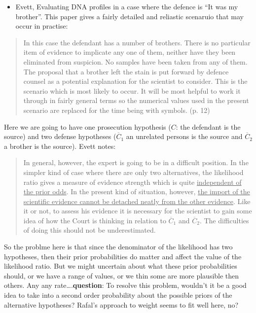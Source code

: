 \documentclass[
  10pt,
  dvipsnames,enabledeprecatedfontcommands]{scrartcl}
\providecommand{\tightlist}{%
  \setlength{\itemsep}{0pt}\setlength{\parskip}{0pt}}
\begin{document}
\begin{itemize}
\tightlist
\item
  Evett, Evaluating DNA profiles in a case where the defence is ``It was
  my brother''. This paper gives a fairly detailed and reliastic
  scenaruio that may occur in practise:
\end{itemize}

\begin{quote}
In this case the defendant has a number of brothers. There is no particular
item of evidence to implicate any one of them, neither have they been
eliminated from suspicion. No samples have been taken from any of them.
The proposal that a brother left the stain is put forward by defence counsel
as a potential explanation for the scientist to consider.
This is the scenario which is most likely to occur. It will be most helpful to
work it through in fairly general terms so the numerical values used in the
present scenario are replaced for the time being with symbols. (p. 12)
\end{quote}

Here we are going to have one prosecution hypothesis (\(C\): the
defendant is the source) and two defense hypotheses (\(\overline{C}_1\)
an unrelated persons is the source and \(\overline{C}_2\) a brother is
the source). Evett notes:

\begin{quote}
In general, however, the expert is going to be in a difficult position. In the
simpler kind of case where there are only two alternatives, the likelihood
ratio gives a measure of evidence strength which is quite \underline{independent of the
prior odds}. In the present kind of situation, however, \underline{the import of the
scientific evidence cannot be detached neatly from the other evidence}. Like
it or not, to assess his evidence it is necessary for the scientist to gain some
idea of how the Court is thinking in relation to $\overline{C}_1$ and $\overline{C}_2$. The difficulties of
doing this should not be underestimated. 
\end{quote}


So the problme here is that since the denominator of the likelihood has
two hypotheses, then their prior probabilities do matter and affect the
value of the likelihood ratio. But we might uncertain about what these
prior probabilities should, or we have a range of values, or we thin
some are more plausible then others. Any any
rate\ldots.\textbf{question}: To resolve this problem, wouldn't it be a
good idea to take into a second order probability about the possible
priors of the alternative hypotheses? Rafal's approach to weight seems
to fit well here, no?
\end{document}
